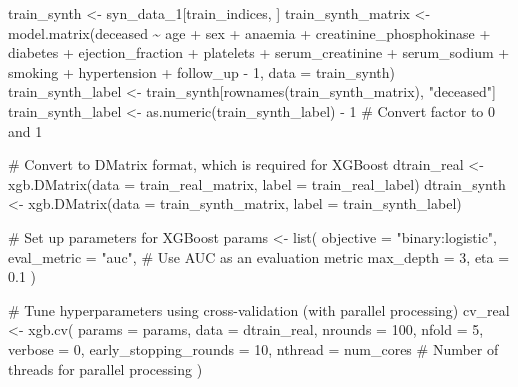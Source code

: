 \documentclass[
  letterpaper,
  DIV=11,
  numbers=noendperiod]{scrartcl}
\newenvironment{Shaded}{\begin{snugshade}}{\end{snugshade}}
\newcommand{\AttributeTok}[1]{\textcolor[rgb]{0.40,0.45,0.13}{#1}}
\newcommand{\CommentTok}[1]{\textcolor[rgb]{0.37,0.37,0.37}{#1}}
\newcommand{\DecValTok}[1]{\textcolor[rgb]{0.68,0.00,0.00}{#1}}
\newcommand{\FloatTok}[1]{\textcolor[rgb]{0.68,0.00,0.00}{#1}}
\newcommand{\FunctionTok}[1]{\textcolor[rgb]{0.28,0.35,0.67}{#1}}
\newcommand{\NormalTok}[1]{\textcolor[rgb]{0.00,0.23,0.31}{#1}}
\newcommand{\OtherTok}[1]{\textcolor[rgb]{0.00,0.23,0.31}{#1}}
\newcommand{\SpecialCharTok}[1]{\textcolor[rgb]{0.37,0.37,0.37}{#1}}
\newcommand{\StringTok}[1]{\textcolor[rgb]{0.13,0.47,0.30}{#1}}
\begin{document}
\begin{Shaded}
\begin{Highlighting}[]
\NormalTok{train\_synth }\OtherTok{\textless{}{-}}\NormalTok{ syn\_data\_1[train\_indices, ]}
\NormalTok{train\_synth\_matrix }\OtherTok{\textless{}{-}} \FunctionTok{model.matrix}\NormalTok{(deceased }\SpecialCharTok{\textasciitilde{}}\NormalTok{ age }\SpecialCharTok{+}\NormalTok{ sex }\SpecialCharTok{+}\NormalTok{ anaemia }\SpecialCharTok{+}\NormalTok{ creatinine\_phosphokinase }\SpecialCharTok{+}\NormalTok{ diabetes }\SpecialCharTok{+}\NormalTok{ ejection\_fraction }\SpecialCharTok{+}\NormalTok{ platelets }\SpecialCharTok{+}\NormalTok{ serum\_creatinine }\SpecialCharTok{+}\NormalTok{ serum\_sodium }\SpecialCharTok{+}\NormalTok{ smoking }\SpecialCharTok{+}\NormalTok{ hypertension }\SpecialCharTok{+}\NormalTok{ follow\_up }\SpecialCharTok{{-}} \DecValTok{1}\NormalTok{, }\AttributeTok{data =}\NormalTok{ train\_synth)}
\NormalTok{train\_synth\_label }\OtherTok{\textless{}{-}}\NormalTok{ train\_synth[}\FunctionTok{rownames}\NormalTok{(train\_synth\_matrix), }\StringTok{"deceased"}\NormalTok{]}
\NormalTok{train\_synth\_label }\OtherTok{\textless{}{-}} \FunctionTok{as.numeric}\NormalTok{(train\_synth\_label) }\SpecialCharTok{{-}} \DecValTok{1}  \CommentTok{\# Convert factor to 0 and 1}

\CommentTok{\# Convert to DMatrix format, which is required for XGBoost}
\NormalTok{dtrain\_real }\OtherTok{\textless{}{-}} \FunctionTok{xgb.DMatrix}\NormalTok{(}\AttributeTok{data =}\NormalTok{ train\_real\_matrix, }\AttributeTok{label =}\NormalTok{ train\_real\_label)}
\NormalTok{dtrain\_synth }\OtherTok{\textless{}{-}} \FunctionTok{xgb.DMatrix}\NormalTok{(}\AttributeTok{data =}\NormalTok{ train\_synth\_matrix, }\AttributeTok{label =}\NormalTok{ train\_synth\_label)}

\CommentTok{\# Set up parameters for XGBoost}
\NormalTok{params }\OtherTok{\textless{}{-}} \FunctionTok{list}\NormalTok{(}
  \AttributeTok{objective =} \StringTok{"binary:logistic"}\NormalTok{,}
  \AttributeTok{eval\_metric =} \StringTok{"auc"}\NormalTok{,  }\CommentTok{\# Use AUC as an evaluation metric}
  \AttributeTok{max\_depth =} \DecValTok{3}\NormalTok{,}
  \AttributeTok{eta =} \FloatTok{0.1}
\NormalTok{)}

\CommentTok{\# Tune hyperparameters using cross{-}validation (with parallel processing)}
\NormalTok{cv\_real }\OtherTok{\textless{}{-}} \FunctionTok{xgb.cv}\NormalTok{(}
  \AttributeTok{params =}\NormalTok{ params,}
  \AttributeTok{data =}\NormalTok{ dtrain\_real,}
  \AttributeTok{nrounds =} \DecValTok{100}\NormalTok{,}
  \AttributeTok{nfold =} \DecValTok{5}\NormalTok{,}
  \AttributeTok{verbose =} \DecValTok{0}\NormalTok{,}
  \AttributeTok{early\_stopping\_rounds =} \DecValTok{10}\NormalTok{,}
  \AttributeTok{nthread =}\NormalTok{ num\_cores  }\CommentTok{\# Number of threads for parallel processing}
\NormalTok{)}


\end{Highlighting}
\end{Shaded}
\end{document}
